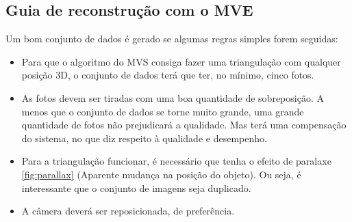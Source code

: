 \subsection{Guia de reconstrução com o MVE}

Um bom conjunto de dados é gerado se algumas regras simples forem seguidas:

\begin{itemize}

\item{Para que o algoritmo do MVS consiga fazer uma triangulação com qualquer posição 3D, o conjunto de dados terá que ter, no mínimo, cinco fotos.}

\item{As fotos devem ser tiradas com uma boa quantidade de sobreposição. A menos que o conjunto de dados se torne muito grande, uma grande quantidade de fotos não prejudicará a qualidade. 
Mas terá uma compensação do sistema, no que diz respeito à qualidade e desempenho.}

\item{Para a triangulação funcionar, é necessário que tenha o efeito de paralaxe \ref{fig:parallax} (Aparente mudança na posição do objeto). Ou seja, é interessante que o conjunto de imagens seja duplicado.}

\item{A câmera deverá ser reposicionada, de preferência.}

\end{itemize}

